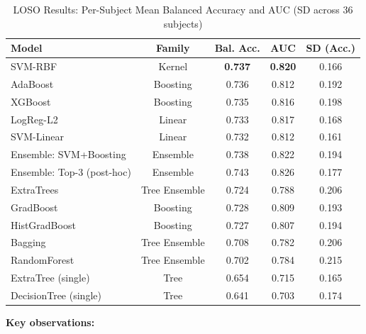 \documentclass[conference]{IEEEtran}
\begin{document}
\begin{table}[htbp]
\caption{LOSO Results: Per-Subject Mean Balanced Accuracy and AUC (SD across 36 subjects)}
\label{tab:loso}
\centering
\begin{tabular}{@{}lcccc@{}}
\toprule
Model & Family & Bal. Acc. & AUC & SD (Acc.) \\
\midrule
SVM-RBF & Kernel & \textbf{0.737} & \textbf{0.820} & 0.166 \\
AdaBoost & Boosting & 0.736 & 0.812 & 0.192 \\
XGBoost & Boosting & 0.735 & 0.816 & 0.198 \\
LogReg-L2 & Linear & 0.733 & 0.817 & 0.168 \\
SVM-Linear & Linear & 0.732 & 0.812 & 0.161 \\
Ensemble: SVM+Boosting & Ensemble & 0.738 & 0.822 & 0.194 \\
Ensemble: Top-3 (post-hoc) & Ensemble & 0.743 & 0.826 & 0.177 \\
ExtraTrees & Tree Ensemble & 0.724 & 0.788 & 0.206 \\
GradBoost & Boosting & 0.728 & 0.809 & 0.193 \\
HistGradBoost & Boosting & 0.727 & 0.807 & 0.194 \\
Bagging & Tree Ensemble & 0.708 & 0.782 & 0.206 \\
RandomForest & Tree Ensemble & 0.702 & 0.784 & 0.215 \\
ExtraTree (single) & Tree & 0.654 & 0.715 & 0.165 \\
DecisionTree (single) & Tree & 0.641 & 0.703 & 0.174 \\
\bottomrule
\end{tabular}
\end{table}

\textbf{Key observations:}
\end{document}
